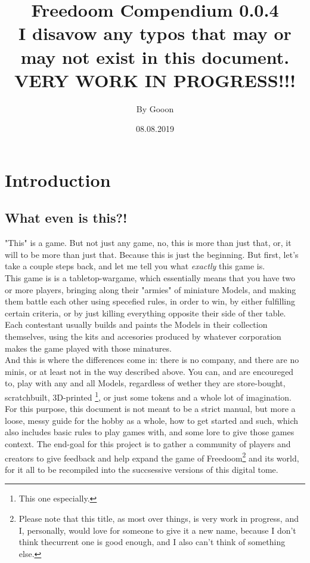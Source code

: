 \documentclass[a4paper,12pt]{book}
\begin{document}
\title{\Large{\textbf{Freedoom Compendium 0.0.4\\ I disavow any typos that may or may not exist in this document.\\ VERY WORK IN PROGRESS!!!}}}
\author{By Gooon}
\date{08.08.2019}

\maketitle
\let\cleardoublepage\clearpage
\tableofcontents
\pagebreak

\chapter{Introduction}
\section{What even is this?!}
"This" is a game. But not just any game, no, this is more than just that, or,  it will to be more than just that. Because this is just the beginning. But first, let's take a couple steps back, and let me tell you what \textit{exactly} this game is. \\
This game is is a tabletop-wargame, which essentially means that you have two or more players, bringing along their "armies" of miniature Models, and making them battle each other using specefied rules, in order to win, by either fulfilling certain criteria, or by just killing everything opposite their side of ther table. Each contestant usually builds and paints the Models in their collection themselves, using the kits and accesories produced by whatever corporation makes the game played with those minatures. \\
And this is where the differences come in: there is no company, and there are no minis, or at least not in the way described above. You can, and are encoureged to, play with any and all Models, regardless of wether they are store-bought, scratchbuilt, 3D-printed \footnote{This one especially.}, or just some tokens and a whole lot of imagination. For this purpose, this document is not meant to be a strict manual, but more a loose, messy guide for the hobby as a whole, how to get started and such, which also includes basic rules to play games with, and some lore to give those games context. The end-goal for this project is to gather a community of players and creators to give feedback and help expand the game of Freedoom\footnote{Please note that this title, as most over things, is very work in progress, and I, personally, would love for someone to give it a new name, because I don't think thecurrent one is good enough, and I also can't think of something else.} and its world, for it all to be recompiled into the succsessive versions of this digital tome.
\end{document}
